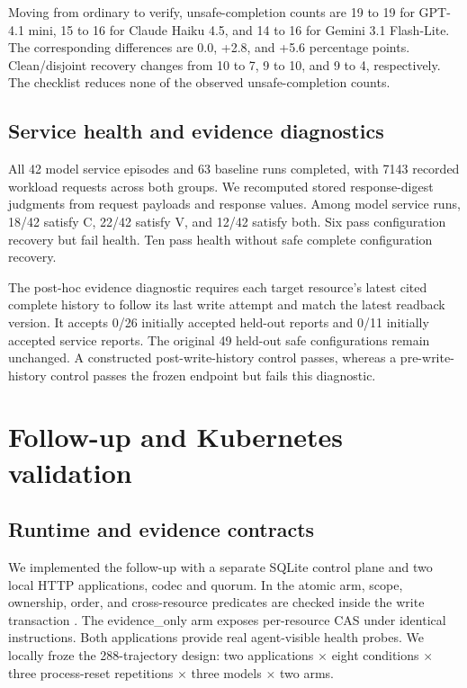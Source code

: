 \documentclass[conference,10pt]{IEEEtran}
\begin{document}
Moving from ordinary to verify, unsafe-completion counts are 19 to 19 for GPT-4.1 mini, 15 to 16 for Claude Haiku 4.5, and 14 to 16 for Gemini 3.1 Flash-Lite. The corresponding differences are 0.0, +2.8, and +5.6 percentage points. Clean/disjoint recovery changes from 10 to 7, 9 to 10, and 9 to 4, respectively. The checklist reduces none of the observed unsafe-completion counts.

\subsection{Service health and evidence diagnostics}

All 42 model service episodes and 63 baseline runs completed, with 7143 recorded workload requests across both groups. We recomputed stored response-digest judgments from request payloads and response values. Among model service runs, 18/42 satisfy C, 22/42 satisfy V, and 12/42 satisfy both. Six pass configuration recovery but fail health. Ten pass health without safe complete configuration recovery.

The post-hoc evidence diagnostic requires each target resource's latest cited complete history to follow its last write attempt and match the latest readback version. It accepts 0/26 initially accepted held-out reports and 0/11 initially accepted service reports. The original 49 held-out safe configurations remain unchanged. A constructed post-write-history control passes, whereas a pre-write-history control passes the frozen endpoint but fails this diagnostic.

\section{Follow-up and Kubernetes validation}

\subsection{Runtime and evidence contracts}

We implemented the follow-up with a separate SQLite control plane and two local HTTP applications, codec and quorum. In the atomic arm, scope, ownership, order, and cross-resource predicates are checked inside the write transaction \cite{ref12}. The evidence\_\allowbreak{}only arm exposes per-resource CAS under identical instructions. Both applications provide real agent-visible health probes. We locally froze the 288-trajectory design: two applications $\times$ eight conditions $\times$ three process-reset repetitions $\times$ three models $\times$ two arms.
\end{document}

